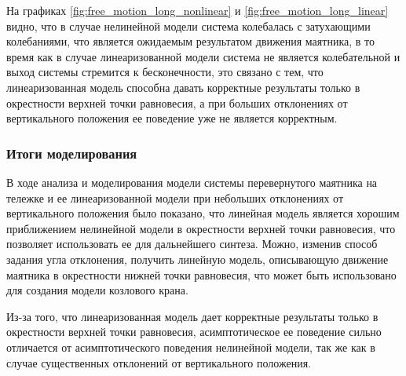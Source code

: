 На графиках \ref{fig:free_motion_long_nonlinear} и \ref{fig:free_motion_long_linear} видно, что
в случае нелинейной модели система колебалась с затухающими колебаниями, что является
ожидаемым результатом движения маятника, в то время как в случае линеаризованной модели система 
не является колебательной и выход системы стремится к бесконечности, это связано с тем, что
линеаризованная модель способна давать корректные результаты только в окрестности 
верхней точки равновесия, а при больших отклонениях от вертикального положения ее поведение
уже не является корректным.

\FloatBarrier
\subsubsection{Итоги моделирования}
В ходе анализа и моделирования модели системы перевернутого маятника на тележке 
и ее линеаризованной модели при небольших отклонениях от вертикального положения 
было показано, что линейная модель является хорошим приближением нелинейной модели 
в окрестности верхней точки равновесия, что позволяет использовать ее для дальнейшего
синтеза. Можно, изменив способ задания угла отклонения, получить линейную модель, 
описывающую движение маятника в окрестности нижней точки равновесия, что 
может быть использовано для создания модели козлового крана.

Из-за того, что линеаризованная модель дает корректные результаты только в окрестности 
верхней точки равновесия, асимптотическое ее поведение сильно отличается от
асимптотического поведения нелинейной модели, так же как в случае 
существенных отклонений от вертикального положения. 